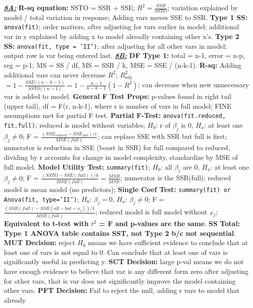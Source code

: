 \documentclass[8pt]{extarticle}
\begin{document}
\textit{\textbf{\underline{8A:}}}
\textbf{R-sq equation:} SSTO = SSR + SSE; $R^2 = \frac{SSR}{SSTO}$; variation 
explained by model / total variation in response; Adding vars moves SSE to SSR.
\textbf{Type 1 SS:} \texttt{anova(fit)}; order matters, after adjusting for vars 
earlier in model; additional var in y explained by adding x to model alreadly 
containing other x's.
\textbf{Type 2 SS:} \texttt{anova(fit, type = 'II')}; after adjusting for all 
other vars in model; output row is var being entered last.
\textit{\textbf{\underline{8B:}}}
\textbf{DF Type 1:} total = n-1, error = n-p, reg = p-1; MS = SS / df,
MS = SSR / k, MSE = SSE / (n-k-1).
\textbf{R-sq:} Adding additional vars can never decrease $R^2$; $R^2_{adj}$ 
$ = 1 - \frac{SSE/(n-k-1)}{SSTO/(n-1)} = 1 - \frac{n-1}{n-k-1}(1-R^2)$; can 
decrease when new unnecessary var is added to model.
\textbf{General F Test Props:} p-values found in right tail (upper tail), df = 
F(r, n-k-1), where r is number of vars in full model; FINE assumptions met for 
partial F test.
\textbf{Partial F-Test:} \texttt{anova(fit.reduced, fit.full)}; reduced is model
without variables; $H_0$: r of $\beta_j$ is 0, $H_a$: at least one $\beta_j \neq 
0$; F = $\frac{(SSE_{reduced} - SSE_{full})/r}
{MSE(full)}$; can replace SSE with SSR but full is first; numerator is reduction 
in SSE (boost in SSR) for full compared to reduced, dividing by r accounts for 
change in model complexity, standardize by MSE of full model.
\textbf{Model Utility Test:} \texttt{summary(fit)}; $H_0$: all $\beta_j$ are 0,
$H_a$: at least one $\beta_j \neq 0$; F = $\frac{(SSTO - SSE(full))
/k}{MSE(full)} = \frac{MSR}{MSE}$; numerator is the SSR(full); reduced model is 
mean model (no predictors);
\textbf{Single Coef Test:} \texttt{summary(fit) or Anova(fit, type='II')}; 
$H_0$: $\beta_j = 0$, $H_a$: $\beta_j \neq 0$; F = 
$\frac{(SSR(full) - SSR(all-but-x_j))/1}{MSE(full)}$; reduced model is full 
model without $x_j$; \textbf{Equivalent to t-test with $t^2$ = F and 
p-values are the same}.
\textbf{SS Total: Type 1 ANOVA table contains SST, not Type 2 b/c not 
sequential}.
\textbf{MUT Decision:} reject $H_0$ means we have sufficient evidence to conclude 
that at least one of vars is not equal to 0. Can conclude that at least one of 
vars is significantly useful in predicting y.
\textbf{SCT Decision:} large p-val means we do not have enough evidence to 
believe that var is any different form zero after adjusting for other vars, 
that is var does not significantly improve the model containing other vars.
\textbf{PFT Decision:} Fail to reject the null, adding r vars to model that already 
\end{document}
